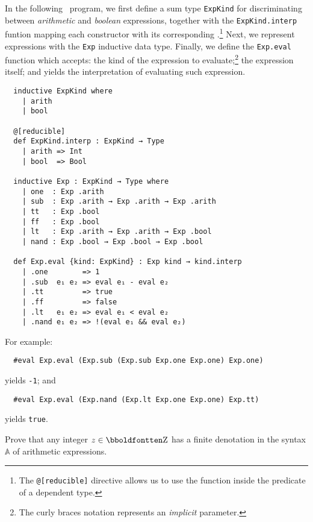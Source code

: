 \documentclass[10pt,justified,nofonts]{tufte-handout}
\begin{document}
%
\begin{answer}
  In the following \Lean\ program, we first define a sum type
  \texttt{ExpKind} for discriminating between \emph{arithmetic} and
  \emph{boolean} expressions, together with the
  \texttt{ExpKind.interp} funtion mapping each constructor with its
  corresponding \Lean.\footnote{The \texttt{@[reducible]} directive
    allows us to use the function inside the predicate of a dependent
    type.}
  Next, we represent expressions with the \texttt{Exp} inductive
  data type.
  Finally, we define the \texttt{Exp.eval} function which
  accepts: the kind of the expression to evaluate;\footnote{The curly braces notation
    represents an \emph{implicit} parameter.} the expression itself; and yields the interpretation
  of evaluating such expression.
  \begin{lstlisting}
  inductive ExpKind where
    | arith
    | bool
  
  @[reducible]
  def ExpKind.interp : ExpKind → Type
    | arith => Int
    | bool  => Bool
  
  inductive Exp : ExpKind → Type where
    | one  : Exp .arith
    | sub  : Exp .arith → Exp .arith → Exp .arith
    | tt   : Exp .bool
    | ff   : Exp .bool
    | lt   : Exp .arith → Exp .arith → Exp .bool
    | nand : Exp .bool → Exp .bool → Exp .bool
  
  def Exp.eval {kind: ExpKind} : Exp kind → kind.interp
    | .one        => 1
    | .sub  e₁ e₂ => eval e₁ - eval e₂
    | .tt         => true
    | .ff         => false
    | .lt   e₁ e₂ => eval e₁ < eval e₂
    | .nand e₁ e₂ => !(eval e₁ && eval e₂)
  \end{lstlisting}
  
  For example:
  \begin{lstlisting}
  #eval Exp.eval (Exp.sub (Exp.sub Exp.one Exp.one) Exp.one)
  \end{lstlisting}
  yields \texttt{-1}; and
  \begin{lstlisting}
  #eval Exp.eval (Exp.nand (Exp.lt Exp.one Exp.one) Exp.tt)
  \end{lstlisting}
  yields \texttt{true}.
\end{answer}
%
\begin{exercise}{3.8}
  Prove that any integer $z \in \intset$ has a finite denotation in
  the syntax $\mathbb{A}$ of arithmetic expressions.
\end{exercise}
\end{document}
